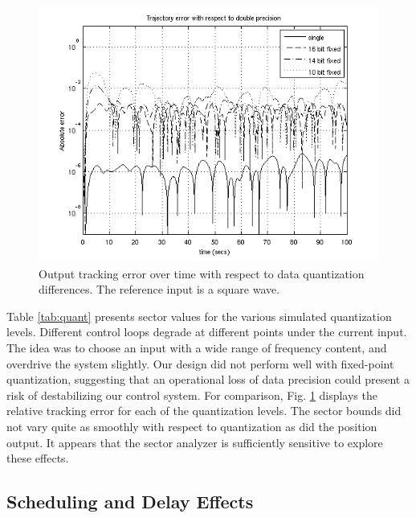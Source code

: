 \begin{figure}[htb]
\centering
\includegraphics[width=\columnwidth]{figures/quantization_error}
    \caption{Output tracking error over time with respect to data quantization differences. The reference input is a square wave.}
    \label{fig:quant_err}
\end{figure}

Table \ref{tab:quant} presents sector values for the various simulated
quantization levels.  Different control loops degrade at different points under the 
current input.  The idea was to choose an input with a wide range of frequency content,
and overdrive the system slightly.  Our design did not perform well with fixed-point
quantization, suggesting that an operational loss of data precision could present a
risk of destabilizing our control system.  For comparison, Fig. \ref{fig:quant_err} 
displays the relative tracking error for each of the quantization levels.  The sector
bounds did not vary quite as smoothly with respect to quantization as did the position 
output.  It appears that the sector analyzer is sufficiently sensitive to explore these
effects.

\subsection{Scheduling and Delay Effects}

